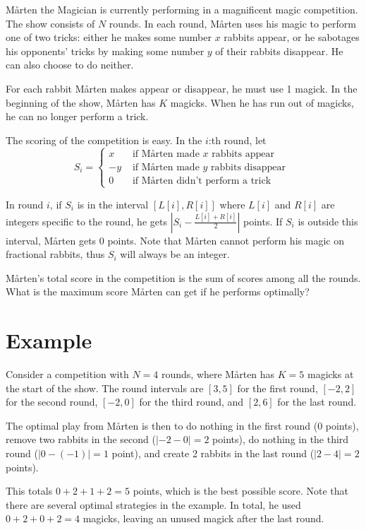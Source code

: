 \newcommand\version{v2}
Mårten the Magician is currently performing in a magnificent magic competition.
The show consists of $N$ rounds.
In each round, Mårten uses his magic to perform one of two tricks: either he makes
some number $x$ rabbits appear, or he sabotages his opponents' tricks by making some number
$y$ of their rabbits disappear. He can also choose to do neither.

For each rabbit Mårten makes appear or disappear, he must use 1 magick.
In the beginning of the show, Mårten has $K$ magicks. When he has run out
of magicks, he can no longer perform a trick.

The scoring of the competition is easy. In the $i$:th round, let 
\[ S_i = \begin{cases}
  x & \text{ if Mårten made $x$ rabbits appear } \\
  -y & \text{ if Mårten made $y$ rabbits disappear } \\
  0 & \text{ if Mårten didn't perform a trick}
\end{cases}
\]

In round $i$, if $S_i$ is in the interval $[L[i], R[i]]$ where $L[i]$ and $R[i]$ are integers specific
to the round, he gets $|S_i - \frac{L[i] + R[i]}{2}|$ points. If $S_i$ is outside this interval,
Mårten gets $0$ points. Note that Mårten cannot perform his magic on fractional rabbits,
thus $S_i$ will always be an integer.

Mårten's total score in the competition is the sum of scores among all the rounds.
What is the maximum score Mårten can get if he performs optimally?

\section*{Example}
Consider a competition with $N = 4$ rounds, where Mårten has $K = 5$ magicks at the start of the show.
The round intervals are $[3, 5]$ for the first round, $[-2, 2]$ for the second round, $[-2, 0]$ for the third
round, and $[2, 6]$ for the last round.

The optimal play from Mårten is then to do nothing in the first round ($0$ points), remove two rabbits in the second ($|-2 - 0| = 2$ points), 
do nothing in the third round ($|0 - (-1)| = 1$ point), and create 2 rabbits in the last round ($|2 - 4| = 2$ points).

This totals $0 + 2 + 1 + 2 = 5$ points, which is the best possible score. Note that there are several optimal strategies in the example.
In total, he used $0 + 2 + 0 + 2 = 4$ magicks, leaving an unused magick after the last round.

